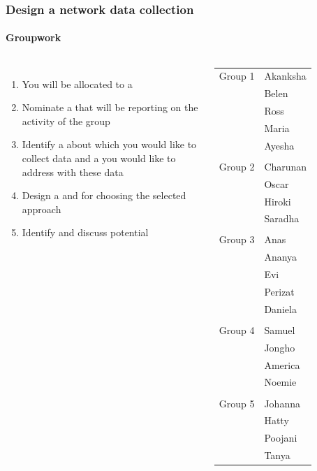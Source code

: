 \documentclass[8pt]{beamer}
\begin{document}
\begin{frame}
\frametitle{Design a network data collection}
\framesubtitle{Groupwork}


\begin{columns}[c]

\begin{enumerate}
	\item You will be allocated to a {\color{blue}{group}}
	\item Nominate a {\color{blue}{group leader}} that will be reporting on the activity of the group
	\item Identify a {\color{blue}{network}} about which you would like to collect data and a {\color{blue}{question}} you would like to address with these data
	\item Design a {\color{blue}{data collection approach}} and {\color{blue}{provide a rationale}} for choosing the selected approach
	\item Identify and discuss potential {\color{blue}{challenges}}
\end{enumerate}

\centering
\small
\begin{table}
\begin{tabular}{ll}
\toprule
Group 1 & Akanksha \\
		& Belen \\
		& Ross \\
		& Maria\\
		& Ayesha\\
\\
Group 2 & Charunan \\
		& Oscar \\
		& Hiroki \\
		& Saradha\\
\\
Group 3 & Anas \\
		& Ananya \\
		& Evi \\
		& Perizat \\
		& Daniela \\
\\
Group 4 & Samuel \\
		& Jongho \\
		& America \\
		& Noemie \\
\\
Group 5 & Johanna \\
		& Hatty \\
		& Poojani \\
		& Tanya \\
\bottomrule
\end{tabular}
\end{table}

\end{columns}

\end{frame}
\end{document}
